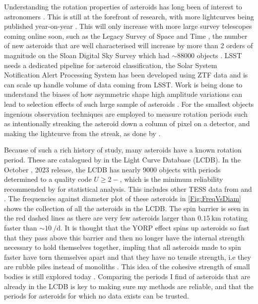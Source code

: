 \documentclass{UCreport}
\begin{document}
Understanding the rotation properties of asteroids has long been of interest to astronomers \citep[e.g.][for early work into the limits of rotation period and the tumbling nature of some small bodies]{Weidenschilling1981,Harris1994}.
This is still at the forefront of research, with more lightcurves being published year-on-year \citep{Harris2015}.
This will only increase with more large survey telescopes coming online soon, such as the Legacy Survey of Space and Time \citep[LSST][]{LSST2019}, the number of new asteroids that are well characterised will increase by more than 2 orders of magnitude on the Sloan Digital Sky Survey \citep[SDSS][]{York2000} which had $\sim 88000$ objects \citet{Parker2008}.
LSST needs a dedicated pipeline for asteroid classification, the Solar System Notification Alert Processing System \citep[SNAPS][]{Trilling2023} has been developed using ZTF data and is can scale up handle volume of data coming from LSST.
Work is being done to understand the biases of how  asymmetric shape high amplitude variations can lead to selection effects of such large sample of asteroids \citet{Levine2023}.
For the smallest objects ingenious observation techniques are employed to measure rotation periods such as intentionally streaking the asteroid down a column of pixel on a detector, and making the lightcurve from the streak, as done by \citet{Bolin2023}.

Because of such a rich history of study, many asteroids have a known rotation period.
These are catalogued by \citet{Warner2009} %
in the Light Curve Database (LCDB).
In the October , 2023 release, the LCDB has nearly 9000 objects with periods determined to a quality code $U\geq 2-$, which is the minimum reliability recommended by \citeauthor{Warner2009} for statistical analysis.
This includes other TESS data from \citet{Pal2020} and \citet{Woods2021}.
The frequencies against diameter plot of these asteroids in \autoref{Fig:FreqVsDiam} shows the collection of all the asteroids in the LCDB.
The spin barrier \citep{Pravec2000} is seen in the red dashed lines as there are very few asteroids larger than $\qty{0.15}{\kilo\metre}$ rotating faster than $\sim \qty{10}{\per\day}$.
It is thought that the YORP effect spins up asteroids so fast that they pass above this barrier and then no longer have the internal strength necessary to hold themselves together, impling that all asteroids made to spin faster have torn themselves apart and that they have no tensile strength, i.e they are rubble piles instead of monoliths \citep{Harris1996}. This idea of the cohesive strength of small bodies is still explored today \citep[e.g.][for V-type asteroids]{Oszkiewicz2020}.
Comparing the periods I find of asteroids that are already in the LCDB is key to making sure my methods are reliable, and that the periods for asteroids for which no data exists can be trusted.
\end{document}
